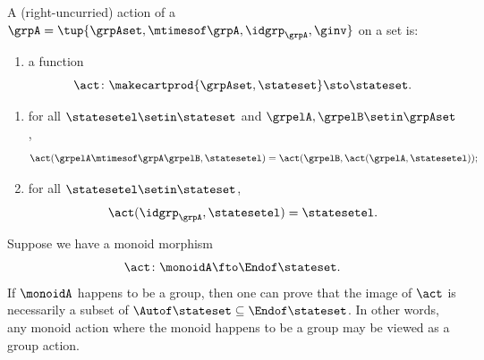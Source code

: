 \begin{ctdefinition}
    \label{def:group-uncurried-action}

    A (right-uncurried) action of a  $\grpA = \tup{\grpAset, \mtimesof\grpA, \idgrp_\grpA, \ginv}$ on a set \stateset is:

    \constit
    \begin{enumerate}
        \item a function
              \begin{equation}
                  \label{eq:group-uncurried-action}
                  \act \colon \makecartprod{\grpAset, \stateset} \sto \stateset.
              \end{equation}
    \end{enumerate}
    \condit
    \begin{enumerate}
        \item for all $\statesetel \setin \stateset$ and $\grpelA,\grpelB\setin\grpAset$,
              \begin{equation}
                  \label{eq:group-uncurried-action-1cond}
                  \act(\grpelA \mtimesof\grpA \grpelB, \statesetel) = \act(\grpelB, \act(\grpelA, \statesetel));
              \end{equation}
        \item for all $\statesetel \setin \stateset$,
              \begin{equation}
                  \label{eq:group-uncurried-action-2cond}
                  \act(\idgrp_\grpA, \statesetel) = \statesetel.
              \end{equation}
    \end{enumerate}
\end{ctdefinition}

\begin{remark}
Suppose we have a monoid morphism
\begin{equation}
\act \colon \monoidA \fto \Endof\stateset.
\end{equation}
If $\monoidA$ happens to be a group, then one can prove that the image of $\act$ is necessarily a subset of $\Autof\stateset \subseteq \Endof\stateset$. In other words, any monoid action where the monoid happens to be a group may be viewed as a group action. 
\end{remark}




